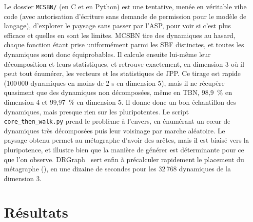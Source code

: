 \documentclass[12pt, a4paper]{article}
\begin{document}
Le dossier \texttt{MCSBN/} (en C et en Python) est une tentative, menée en véritable vibe code (avec autorisation d'écriture sans demande de permission pour le modèle de langage), d'explorer le paysage sans passer par l'ASP, pour voir si c'est plus efficace et quelles en sont les limites.
MCSBN tire des dynamiques au hasard, chaque fonction étant prise uniformément parmi les SBF distinctes, et toutes les dynamiques sont donc équiprobables.
Il calcule ensuite lui-même leur décomposition et leurs statistiques, et retrouve exactement, en dimension 3 où il peut tout énumérer, les vecteurs et les statistiques de JPP.
Ce tirage est rapide (100\,000 dynamiques en moins de 2 s en dimension 5), mais il ne récupère quasiment que des dynamiques non décomposées, même en TBN, 98,9~\% en dimension 4 et 99,97~\% en dimension 5.
Il donne donc un bon échantillon des dynamiques, mais presque rien sur les pluripotentes.
Le script \texttt{core\_then\_walk.py} prend le problème à l'envers, en énumérant un cœur de dynamiques très décomposées puis leur voisinage par marche aléatoire.
Le paysage obtenu permet au métagraphe d'avoir des arêtes, mais il est biaisé vers la pluripotence, et illustre bien que la manière de générer est déterminante pour ce que l'on observe.
DRGraph~\cite{zhu2020} sert enfin à précalculer rapidement le placement du métagraphe (), en une dizaine de secondes pour les 32\,768 dynamiques de la dimension 3.

\section{Résultats}
\label{sec:observations}
\end{document}

